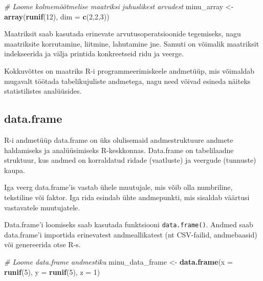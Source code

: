 \documentclass[
]{book}
\newenvironment{Shaded}{\begin{snugshade}}{\end{snugshade}}
\newcommand{\AttributeTok}[1]{\textcolor[rgb]{0.13,0.29,0.53}{#1}}
\newcommand{\CommentTok}[1]{\textcolor[rgb]{0.56,0.35,0.01}{\textit{#1}}}
\newcommand{\DecValTok}[1]{\textcolor[rgb]{0.00,0.00,0.81}{#1}}
\newcommand{\FunctionTok}[1]{\textcolor[rgb]{0.13,0.29,0.53}{\textbf{#1}}}
\newcommand{\NormalTok}[1]{#1}
\newcommand{\OtherTok}[1]{\textcolor[rgb]{0.56,0.35,0.01}{#1}}
\renewenvironment{Shaded} {\begin{snugshade}\footnotesize} {\end{snugshade}}
\begin{document}
\begin{Shaded}
\begin{Highlighting}[]
\CommentTok{\# Loome kolmemõõtmelise maatriksi juhuslikest arvudest}
\NormalTok{minu\_array }\OtherTok{\textless{}{-}} \FunctionTok{array}\NormalTok{(}\FunctionTok{runif}\NormalTok{(}\DecValTok{12}\NormalTok{), }\AttributeTok{dim =} \FunctionTok{c}\NormalTok{(}\DecValTok{2}\NormalTok{,}\DecValTok{2}\NormalTok{,}\DecValTok{3}\NormalTok{))}
\end{Highlighting}
\end{Shaded}

Maatriksit saab kasutada erinevate arvutusoperatsioonide tegemiseks, nagu maatriksite korrutamine, liitmine, lahutamine jne. Samuti on võimalik maatriksit indekseerida ja välja printida konkreetseid ridu ja veerge.

Kokkuvõttes on maatriks R-i programmeerimiskeele andmetüüp, mis võimaldab mugavalt töötada tabelikujuliste andmetega, nagu need võivad esineda näiteks statistilistes analüüsides.

\subsection{data.frame}\label{data.frame}

R-i andmetüüp data.frame on üks olulisemaid andmestruktuure andmete haldamiseks ja analüüsimiseks R-keskkonnas. Data.frame on tabelilaadne struktuur, kus andmed on korraldatud ridade (vaatluste) ja veergude (tunnuste) kaupa.

Iga veerg data.frame'is vastab ühele muutujale, mis võib olla numbriline, tekstiline või faktor. Iga rida esindab ühte andmepunkti, mis sisaldab väärtusi vastavatele muutujatele.

Data.frame'i loomiseks saab kasutada funktsiooni \texttt{data.frame()}. Andmed saab data.frame'i importida erinevatest andmeallikatest (nt CSV-failid, andmebaasid) või genereerida otse R-s.

\begin{Shaded}
\begin{Highlighting}[]
\CommentTok{\# Loome data.frame andmestiku}
\NormalTok{minu\_data\_frame }\OtherTok{\textless{}{-}} \FunctionTok{data.frame}\NormalTok{(}\AttributeTok{x =} \FunctionTok{runif}\NormalTok{(}\DecValTok{5}\NormalTok{), }\AttributeTok{y =} \FunctionTok{runif}\NormalTok{(}\DecValTok{5}\NormalTok{), }\AttributeTok{z =} \DecValTok{1}\NormalTok{)}
\end{Highlighting}
\end{Shaded}
\end{document}

